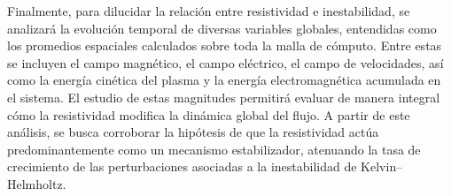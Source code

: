 Finalmente, para dilucidar la relación entre resistividad e inestabilidad, se analizará la evolución temporal de diversas variables globales, entendidas como los promedios espaciales calculados sobre toda la malla de cómputo. Entre estas se incluyen el campo magnético, el campo eléctrico, el campo de velocidades, así como la energía cinética del plasma y la energía electromagnética acumulada en el sistema. El estudio de estas magnitudes permitirá evaluar de manera integral cómo la resistividad modifica la dinámica global del flujo. A partir de este análisis, se busca corroborar la hipótesis de que la resistividad actúa predominantemente como un mecanismo estabilizador, atenuando la tasa de crecimiento de las perturbaciones asociadas a la inestabilidad de Kelvin–Helmholtz.